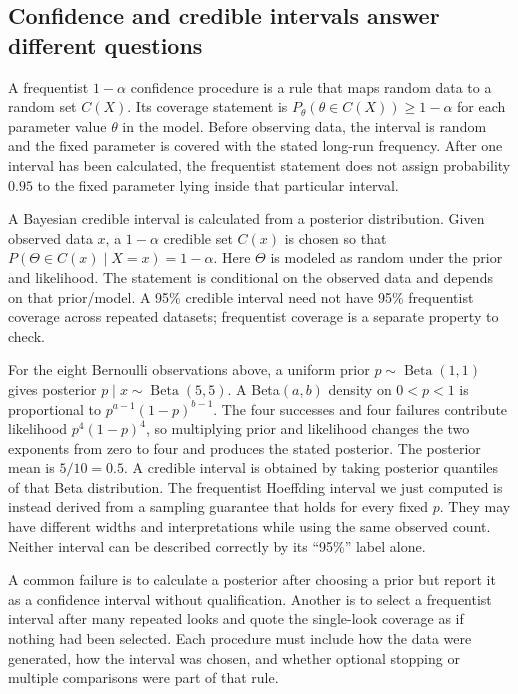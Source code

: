 \subsection{Confidence and credible intervals answer different questions}\label{03-visual-computing-i-ch012-confidence-and-credible-intervals-answer-different-questions}

A frequentist \(1-\alpha\) confidence procedure is a rule that maps random data to a random set \(C(X)\). Its coverage statement is \(P_\theta(\theta\in C(X))\ge1-\alpha\) for each parameter value \(\theta\) in the model. Before observing data, the interval is random and the fixed parameter is covered with the stated long-run frequency. After one interval has been calculated, the frequentist statement does not assign probability \(0.95\) to the fixed parameter lying inside that particular interval.

A Bayesian credible interval is calculated from a posterior distribution. Given observed data \(x\), a \(1-\alpha\) credible set \(C(x)\) is chosen so that \(P(\Theta\in C(x)\mid X=x)=1-\alpha\). Here \(\Theta\) is modeled as random under the prior and likelihood. The statement is conditional on the observed data and depends on that prior/model. A 95\% credible interval need not have 95\% frequentist coverage across repeated datasets; frequentist coverage is a separate property to check.

For the eight Bernoulli observations above, a uniform prior \(p\sim\operatorname{Beta}(1,1)\) gives posterior \(p\mid x\sim\operatorname{Beta}(5,5)\). A Beta\((a,b)\) density on \(0<p<1\) is proportional to \(p^{a-1}(1-p)^{b-1}\). The four successes and four failures contribute likelihood \(p^4(1-p)^4\), so multiplying prior and likelihood changes the two exponents from zero to four and produces the stated posterior. The posterior mean is \(5/10=0.5\). A credible interval is obtained by taking posterior quantiles of that Beta distribution. The frequentist Hoeffding interval we just computed is instead derived from a sampling guarantee that holds for every fixed \(p\). They may have different widths and interpretations while using the same observed count. Neither interval can be described correctly by its ``95\%'' label alone.

A common failure is to calculate a posterior after choosing a prior but report it as a confidence interval without qualification. Another is to select a frequentist interval after many repeated looks and quote the single-look coverage as if nothing had been selected. Each procedure must include how the data were generated, how the interval was chosen, and whether optional stopping or multiple comparisons were part of that rule.

